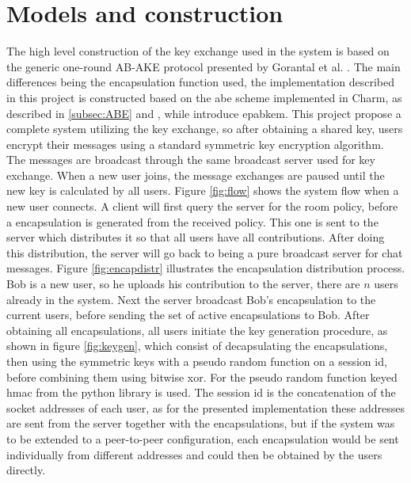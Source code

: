 \section{Models and construction}
The high level construction of the key exchange used in the system is based on the generic one-round AB-AKE protocol presented by Gorantal et al. \cite{gorantla2010attribute}. The main differences being the encapsulation function used, the implementation described in this project is constructed based on the \gls{abe} scheme implemented in Charm, as described in \ref{subsec:ABE} and \cite{abe_waters09}, while \cite{gorantla2010attribute} introduce \gls{epabkem}. This project propose a complete system utilizing the key exchange, so after obtaining a shared key, users encrypt their messages using a standard symmetric key encryption algorithm. The messages are broadcast through the same broadcast server used for key exchange. When a new user joins, the message exchanges are paused until the new key is calculated by all users. Figure \ref{fig:flow} shows the system flow when a new user connects. A client will first query the server for the room policy, before a encapsulation is generated from the received policy. This one is sent to the server which distributes it so that all users have all contributions. After doing this distribution, the server will go back to being a pure broadcast server for chat messages. Figure \ref{fig:encapdistr} illustrates the encapsulation distribution process. Bob is a new user, so he uploads his contribution to the server, there are $n$ users already in the system. Next the server broadcast Bob's encapsulation to the current users, before sending the set of active encapsulations to Bob. After obtaining all encapsulations, all users initiate the key generation procedure, as shown in figure \ref{fig:keygen}, which consist of decapsulating the encapsulations, then using the symmetric keys with a pseudo random function on a session id, before combining them using bitwise xor. For the pseudo random function keyed hmac from the python library is used. The session id is the concatenation of the socket addresses of each user, as for the presented implementation these addresses are sent from the server together with the encapsulations, but if the system was to be extended to a peer-to-peer configuration, each encapsulation would be sent individually from different addresses and could then be obtained by the users directly. 




